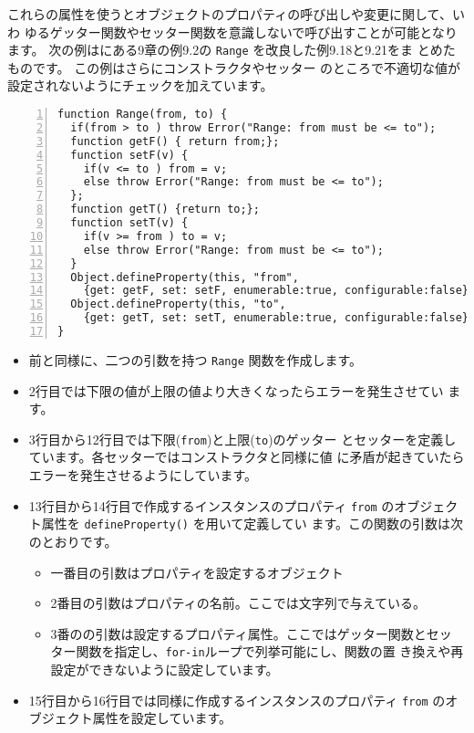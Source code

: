 これらの属性を使うとオブジェクトのプロパティの呼び出しや変更に関して、いわ
ゆるゲッター関数やセッター関数を意識しないで呼び出すことが可能となります。
次の例は\cite{JavaScript}にある9章の例9.2の \texttt{Range} を改良した例9.18と9.21をま
とめたものです。
この例はさらにコンストラクタやセッター
 のところで不適切な値が設定されないようにチェックを加えています。
\begin{Verbatim}[firstnumber=1,numbers=left]
function Range(from, to) {
  if(from > to ) throw Error("Range: from must be <= to");
  function getF() { return from;};
  function setF(v) {
    if(v <= to ) from = v;
    else throw Error("Range: from must be <= to");
  };
  function getT() {return to;};
  function setT(v) {
    if(v >= from ) to = v;
    else throw Error("Range: from must be <= to");
  }
  Object.defineProperty(this, "from",
    {get: getF, set: setF, enumerable:true, configurable:false});
  Object.defineProperty(this, "to",
    {get: getT, set: setT, enumerable:true, configurable:false});
}
\end{Verbatim}
\begin{itemize}
 \item 前と同様に、二つの引数を持つ \texttt{Range} 関数を作成します。
 \item 2行目では下限の値が上限の値より大きくなったらエラーを発生させてい
       ます。
 \item 3行目から12行目では下限(\texttt{from})と上限(\texttt{to})のゲッター
       とセッターを定義しています。各セッターではコンストラクタと同様に値
       に矛盾が起きていたらエラーを発生させるようにしています。
 \item 13行目から14行目で作成するインスタンスのプロパティ \texttt{from}
       のオブジェクト属性を \texttt{defineProperty()} を用いて定義してい
       ます。この関数の引数は次のとおりです。
 \begin{itemize}
  \item 一番目の引数はプロパティを設定するオブジェクト
  \item 2番目の引数はプロパティの名前。ここでは文字列で与えている。
  \item 3番のの引数は設定するプロパティ属性。ここではゲッター関数とセッ
	ター関数を指定し、\texttt{for-in}ループで列挙可能にし、関数の置
	き換えや再設定ができないように設定しています。
 \end{itemize} 
 \item 15行目から16行目では同様に作成するインスタンスのプロパティ \texttt{from}
       のオブジェクト属性を設定しています。
\end{itemize}
